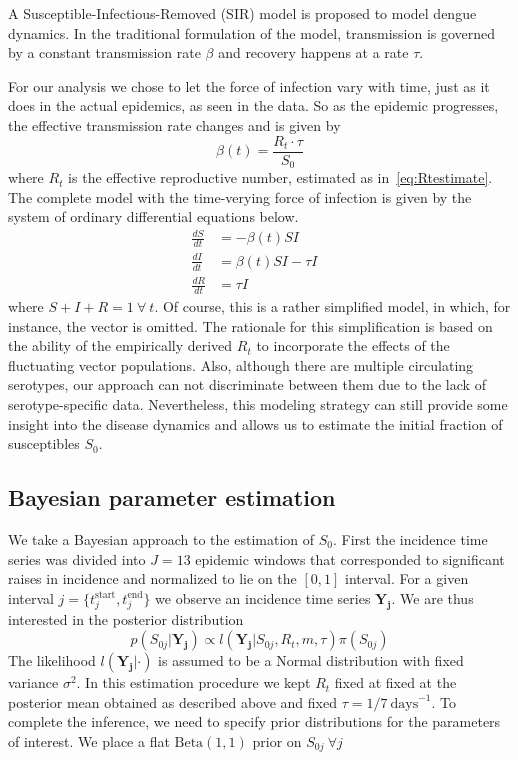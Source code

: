 A Susceptible-Infectious-Removed (SIR) model is proposed to model dengue 
dynamics.
In the traditional formulation of the model, transmission is governed by a 
constant transmission rate $\beta$ and recovery happens at a rate $\tau$.

For our analysis we chose to let the force of infection vary with time, just 
as it does in the actual epidemics, as seen in the data. So as the epidemic 
progresses, the effective transmission  rate changes and is 
given by 
\begin{equation} 
 \label{eq:effbeta}
 \beta(t) = \frac{R_t\cdot\tau}{S_0}
\end{equation}
where $R_t$ is the effective reproductive number, estimated as 
in~\ref{eq:Rtestimate}.
The complete model with the time-verying force of infection is given by
the system of ordinary differential equations below.
\begin{align}
   \label{eq:model}
 \frac{dS}{dt} &= -\beta(t)SI \\     \nonumber
 \frac{dI}{dt} &= \beta(t)SI - \tau I&\\      \nonumber
 \frac{dR}{dt} &= \tau I&
\end{align}  
where $S + I + R = 1 \: \forall\: t$. %
Of course, this is a rather simplified model, in which, for instance, the 
vector is omitted.
The rationale for this simplification is based on the ability of the 
empirically derived $R_t$  to incorporate the effects of the fluctuating vector 
populations.
Also, although there are multiple circulating serotypes, our approach
can not discriminate between them due to the lack of serotype-specific data.
Nevertheless, this modeling strategy can still provide some insight into the 
disease dynamics and allows us to estimate the initial fraction of susceptibles 
$S_0$.

\subsection*{Bayesian parameter estimation}
We take a Bayesian approach to the estimation of $S_0$.
First the incidence time series was divided into $J=13$ 
epidemic windows that corresponded to significant raises in incidence and 
normalized to lie on the $[0,1]$ interval.
For a given interval $j = \{ t_j^{\text{start}}, t_j^{\text{end}} \} $ we 
observe an incidence time series $\mathbf{Y_{j}}$.
We are thus interested in the posterior distribution
\begin{equation}
 \label{eq:S0post}
 p(S_{0j}|\mathbf{Y_{j}}) \propto l(\mathbf{Y_{j}}|S_{0j}, R_t, m, \tau 
)\pi(S_{0j}) 
\end{equation}
The likelihood $l(\mathbf{Y_{j}}|\cdot)$ is assumed to be a Normal distribution 
with fixed variance $\sigma^2$.
In this estimation procedure we kept $R_t$ fixed at fixed at the posterior mean 
obtained as described above and fixed $\tau = 1/7\: \text{days}^{-1}$.
To complete the inference, we need to specify prior distributions for the 
parameters of interest.
We place a flat $\text{Beta}(1, 1)$ prior on $S_{0j}\:\forall j$

